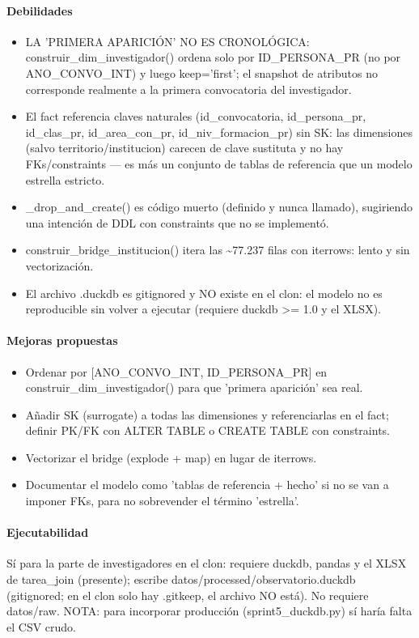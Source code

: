 \paragraph{Debilidades}
\begin{itemize}
  \item LA 'PRIMERA APARICIÓN' NO ES CRONOLÓGICA: construir\_dim\_investigador() ordena solo por ID\_PERSONA\_PR (no por ANO\_CONVO\_INT) y luego keep='first'; el snapshot de atributos no corresponde realmente a la primera convocatoria del investigador.
  \item El fact referencia claves naturales (id\_convocatoria, id\_persona\_pr, id\_clas\_pr, id\_area\_con\_pr, id\_niv\_formacion\_pr) sin SK: las dimensiones (salvo territorio/institucion) carecen de clave sustituta y no hay FKs/constraints --- es más un conjunto de tablas de referencia que un modelo estrella estricto.
  \item \_drop\_and\_create() es código muerto (definido y nunca llamado), sugiriendo una intención de DDL con constraints que no se implementó.
  \item construir\_bridge\_institucion() itera las \textasciitilde{}77.237 filas con iterrows: lento y sin vectorización.
  \item El archivo .duckdb es gitignored y NO existe en el clon: el modelo no es reproducible sin volver a ejecutar (requiere duckdb >= 1.0 y el XLSX).
\end{itemize}

\paragraph{Mejoras propuestas}
\begin{itemize}
  \item Ordenar por [ANO\_CONVO\_INT, ID\_PERSONA\_PR] en construir\_dim\_investigador() para que 'primera aparición' sea real.
  \item Añadir SK (surrogate) a todas las dimensiones y referenciarlas en el fact; definir PK/FK con ALTER TABLE o CREATE TABLE con constraints.
  \item Vectorizar el bridge (explode + map) en lugar de iterrows.
  \item Documentar el modelo como 'tablas de referencia + hecho' si no se van a imponer FKs, para no sobrevender el término 'estrella'.
\end{itemize}

\paragraph{Ejecutabilidad}
Sí para la parte de investigadores en el clon: requiere duckdb, pandas y el XLSX de tarea\_join (presente); escribe datos/processed/observatorio.duckdb (gitignored; en el clon solo hay .gitkeep, el archivo NO está). No requiere datos/raw. NOTA: para incorporar producción (sprint5\_duckdb.py) sí haría falta el CSV crudo.

